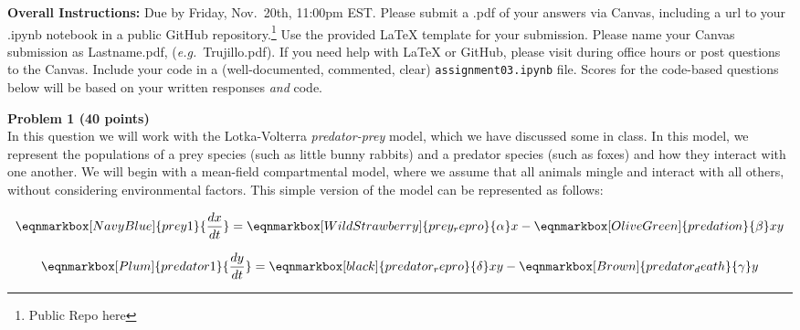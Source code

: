 \documentclass{article}
\newenvironment{problem}[2][Problem]
    { \begin{mdframed}[backgroundcolor=gray!20] \textbf{#1 #2} \\}
    {  \end{mdframed}}
\begin{document}
\textbf{Overall Instructions:}
Due by Friday, Nov.~20th, 11:00pm EST. Please submit a .pdf of your answers via Canvas, including a url to your .ipynb notebook in a public GitHub repository.\footnote{Public Repo here \repourl} Use the provided \LaTeX{} template for your submission. Please name your Canvas submission as Lastname.pdf, (\textit{e.g.}~Trujillo.pdf). If you need help with \LaTeX{} or GitHub, please visit during office hours or post questions to the Canvas. Include your code in a (well-documented, commented, clear) \texttt{assignment03.ipynb} file. Scores for the code-based questions below will be based on your written responses \textit{and} code.

\begin{problem}{1 (40 points)}

In this question we will work with the Lotka-Volterra \textit{predator-prey} model, which we have discussed some in class. In this model, we represent the populations of a prey species (such as little bunny rabbits) and a predator species (such as foxes) and how they interact with one another. We will begin with a mean-field compartmental model, where we assume that all animals mingle and interact with all others, without considering environmental factors. This simple version of the model can be represented as follows:

\begin{equation*}
    \eqnmarkbox[NavyBlue]{prey1}{\frac{dx}{dt}} = 
    \eqnmarkbox[WildStrawberry]{prey_repro}{\alpha} x - 
    \eqnmarkbox[OliveGreen]{predation}{\beta} xy
\end{equation*}

\vspace{1em}

\begin{equation*}
    \eqnmarkbox[Plum]{predator1}{\frac{dy}{dt}} = 
    \eqnmarkbox[black]{predator_repro}{\delta} xy
    - \eqnmarkbox[Brown]{predator_death}{\gamma}y
\end{equation*}

\vspace{1em}


\end{problem}
\end{document}
